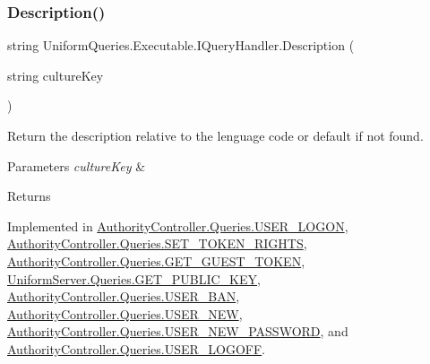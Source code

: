 \subsubsection{\texorpdfstring{Description()}{Description()}}
{\footnotesize\ttfamily string Uniform\+Queries.\+Executable.\+I\+Query\+Handler.\+Description (\begin{DoxyParamCaption}\item[{string}]{culture\+Key }\end{DoxyParamCaption})}



Return the description relative to the lenguage code or default if not found. 


\begin{DoxyParams}{Parameters}
{\em culture\+Key} & \\
\hline
\end{DoxyParams}
\begin{DoxyReturn}{Returns}

\end{DoxyReturn}


Implemented in \mbox{\hyperlink{class_authority_controller_1_1_queries_1_1_u_s_e_r___l_o_g_o_n_af448426be46032c3ae103cdf4ea5f40b}{Authority\+Controller.\+Queries.\+U\+S\+E\+R\+\_\+\+L\+O\+G\+ON}}, \mbox{\hyperlink{class_authority_controller_1_1_queries_1_1_s_e_t___t_o_k_e_n___r_i_g_h_t_s_a149fb8950cf0ebbcb47b6a238c6458d2}{Authority\+Controller.\+Queries.\+S\+E\+T\+\_\+\+T\+O\+K\+E\+N\+\_\+\+R\+I\+G\+H\+TS}}, \mbox{\hyperlink{class_authority_controller_1_1_queries_1_1_g_e_t___g_u_e_s_t___t_o_k_e_n_a72902cb3b94f31ec4f8e6cd0bb1f2ed8}{Authority\+Controller.\+Queries.\+G\+E\+T\+\_\+\+G\+U\+E\+S\+T\+\_\+\+T\+O\+K\+EN}}, \mbox{\hyperlink{class_uniform_server_1_1_queries_1_1_g_e_t___p_u_b_l_i_c___k_e_y_aee414e6882494609ed576f061d662dc2}{Uniform\+Server.\+Queries.\+G\+E\+T\+\_\+\+P\+U\+B\+L\+I\+C\+\_\+\+K\+EY}}, \mbox{\hyperlink{class_authority_controller_1_1_queries_1_1_u_s_e_r___b_a_n_a0635966a71b389cbb4354e61e3c52513}{Authority\+Controller.\+Queries.\+U\+S\+E\+R\+\_\+\+B\+AN}}, \mbox{\hyperlink{class_authority_controller_1_1_queries_1_1_u_s_e_r___n_e_w_ab0995d0559e0033ea963acaccb6e37bf}{Authority\+Controller.\+Queries.\+U\+S\+E\+R\+\_\+\+N\+EW}}, \mbox{\hyperlink{class_authority_controller_1_1_queries_1_1_u_s_e_r___n_e_w___p_a_s_s_w_o_r_d_a04d2af1732d4ac353076d489fe75c696}{Authority\+Controller.\+Queries.\+U\+S\+E\+R\+\_\+\+N\+E\+W\+\_\+\+P\+A\+S\+S\+W\+O\+RD}}, and \mbox{\hyperlink{class_authority_controller_1_1_queries_1_1_u_s_e_r___l_o_g_o_f_f_a2cb738d74699241341b691cc55b57e1d}{Authority\+Controller.\+Queries.\+U\+S\+E\+R\+\_\+\+L\+O\+G\+O\+FF}}.

